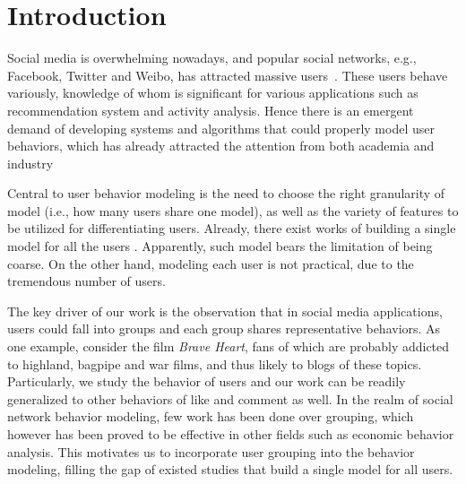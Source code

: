 \section{Introduction}
\label{sec:intro}

\par Social media is overwhelming nowadays, and popular social networks, e.g., Facebook, Twitter and Weibo, has attracted  massive users~\cite{DBLP:journals/fcsc/MaLHLH16,DBLP:journals/tkde/DuanMAMH17,DBLP:conf/icde/HuAMH16,IEEEexample:conf/wsdm/FengW13,IEEEexample:conf/ijcai/ZhangLTCL13}.
These users behave variously, knowledge of whom is significant for various applications such as recommendation system and activity analysis.
Hence there is an emergent demand of developing systems and algorithms that could properly model user behaviors, which has already attracted the attention from both academia and industry~\cite{IEEEexample:conf/wsdm/FengW13,IEEEexample:conf/ijcai/ZhangLTCL13,IEEEexample:conf/cikm/JiangLSW15,IEEEexample:conf/sigir/JiangLSLLMW16,IEEEexample:zhang2015retweet,IEEEexample:conf/pakdd/GiatsoglouCSFV15,IEEEexample:journals/corr/RanganathMHTL15}

Central to user behavior modeling is the need to choose the right granularity of model (i.e., how many users share one model), as well as the variety of features to be utilized for differentiating users.
Already, there exist works of building a single model for all the users \cite{IEEEexample:conf/wsdm/FengW13,IEEEexample:conf/ijcai/ZhangLTCL13}.
Apparently, such model bears the limitation of being coarse.
On the other hand, modeling each user is not practical, due to the tremendous number of users.

The key driver of our work is the observation that in social media applications, users could fall into groups and each group shares representative behaviors.
%
As one example, consider the film \textit{Brave Heart}, fans of which are probably addicted to highland, bagpipe and war films, and thus likely to \ret{} blogs of these topics.
Particularly, we study the \retg{} behavior of users and our work can be readily generalized to other behaviors of like and comment as well.
In the realm of social network behavior modeling, few work has been done over grouping, which however has been proved to be effective in other fields such as economic behavior analysis.
This motivates us to incorporate user grouping into the \retg{} behavior modeling, filling the gap of existed studies that build a single model for all users.

